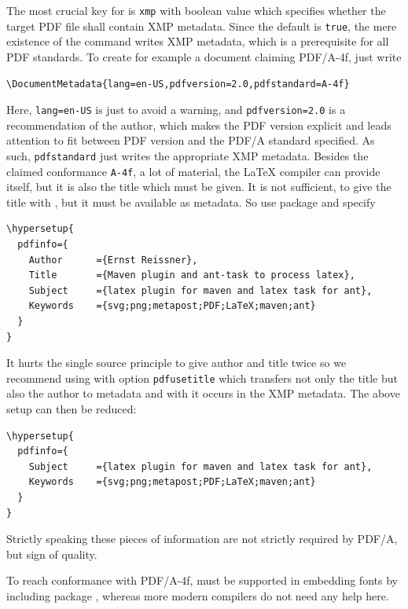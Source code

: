 The most crucial key for  is \texttt{xmp} 
with boolean value which specifies whether the target PDF file shall contain XMP metadata. 
Since the default is \texttt{true}, the mere existence of the command  writes XMP metadata, 
which is a prerequisite for all PDF standards. 
To create for example a document claiming PDF/A-4f, 
just write 
%
\begin{Verbatim}[fontsize=\small]
\DocumentMetadata{lang=en-US,pdfversion=2.0,pdfstandard=A-4f}
\end{Verbatim}
%
Here, \texttt{lang=en-US} is just to avoid a warning, and \texttt{pdfversion=2.0} is a recommendation of the author, 
which makes the PDF version explicit and leads attention to fit between PDF version and the PDF/A standard specified. 
As such, \texttt{pdfstandard} just writes the appropriate XMP metadata. 
Besides the claimed conformance \texttt{A-4f}, a lot of material, the \LaTeX{} compiler can provide itself, 
but it is also the title which must be given. 
It is not sufficient, to give the title with , but it must be available as metadata. 
So use package  and specify 
%
\begin{Verbatim}[fontsize=\small]
\hypersetup{
  pdfinfo={
    Author      ={Ernst Reissner},
    Title       ={Maven plugin and ant-task to process latex},
    Subject     ={latex plugin for maven and latex task for ant},
    Keywords    ={svg;png;metapost;PDF;LaTeX;maven;ant}
  }
}
\end{Verbatim}
%
It hurts the single source principle to give author and title twice 
so we recommend using  with option \texttt{pdfusetitle} 
which transfers not only the title but also the author to metadata 
and with  it occurs in the XMP metadata. 
The above setup can then be reduced: 
%
\begin{Verbatim}[fontsize=\small]
\hypersetup{
  pdfinfo={
    Subject     ={latex plugin for maven and latex task for ant},
    Keywords    ={svg;png;metapost;PDF;LaTeX;maven;ant}
  }
}
\end{Verbatim}
%
Strictly speaking these pieces of information are not strictly required by PDF/A, 
but sign of quality. 


To reach conformance with PDF/A-4f,  must be supported in embedding fonts 
by including package , whereas more modern compilers do not need any help here. 
\medskip

